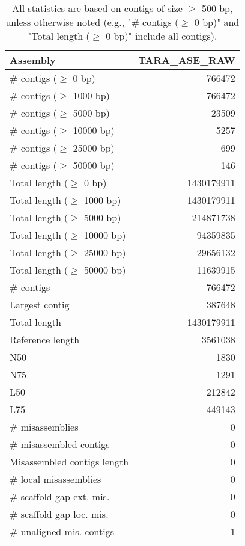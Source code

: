 \documentclass[12pt,a4paper]{article}
\begin{document}
\begin{table}[ht]
\begin{center}
\caption{All statistics are based on contigs of size $\geq$ 500 bp, unless otherwise noted (e.g., "\# contigs ($\geq$ 0 bp)" and "Total length ($\geq$ 0 bp)" include all contigs).}
\begin{tabular}{|l*{1}{|r}|}
\hline
Assembly & TARA\_ASE\_RAW \\ \hline
\# contigs ($\geq$ 0 bp) & 766472 \\ \hline
\# contigs ($\geq$ 1000 bp) & 766472 \\ \hline
\# contigs ($\geq$ 5000 bp) & 23509 \\ \hline
\# contigs ($\geq$ 10000 bp) & 5257 \\ \hline
\# contigs ($\geq$ 25000 bp) & 699 \\ \hline
\# contigs ($\geq$ 50000 bp) & 146 \\ \hline
Total length ($\geq$ 0 bp) & 1430179911 \\ \hline
Total length ($\geq$ 1000 bp) & 1430179911 \\ \hline
Total length ($\geq$ 5000 bp) & 214871738 \\ \hline
Total length ($\geq$ 10000 bp) & 94359835 \\ \hline
Total length ($\geq$ 25000 bp) & 29656132 \\ \hline
Total length ($\geq$ 50000 bp) & 11639915 \\ \hline
\# contigs & 766472 \\ \hline
Largest contig & 387648 \\ \hline
Total length & 1430179911 \\ \hline
Reference length & 3561038 \\ \hline
N50 & 1830 \\ \hline
N75 & 1291 \\ \hline
L50 & 212842 \\ \hline
L75 & 449143 \\ \hline
\# misassemblies & 0 \\ \hline
\# misassembled contigs & 0 \\ \hline
Misassembled contigs length & 0 \\ \hline
\# local misassemblies & 0 \\ \hline
\# scaffold gap ext. mis. & 0 \\ \hline
\# scaffold gap loc. mis. & 0 \\ \hline
\# unaligned mis. contigs & 1 \\ \hline

\end{tabular}
\end{center}
\end{table}
\end{document}
